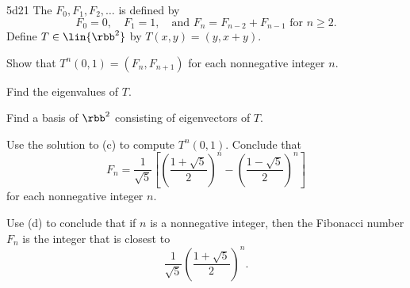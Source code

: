 \begin{exercise}{5d21}
    The  $F_0, F_1, F_2, \ldots$ is defined by
    \[
        F_0 = 0, \quad F_1 = 1, \quad \text{and } F_n = F_{n-2} + F_{n-1} \text{ for } n \geq 2.
    \]
    Define $T \in \lin{\rbb^2}$ by $T(x, y) = (y, x + y)$.
    \begin{subexercises}
        \item Show that $T^n(0, 1) = (F_n, F_{n+1})$ for each nonnegative integer $n$.
        \item Find the eigenvalues of $T$.
        \item Find a basis of $\rbb^2$ consisting of eigenvectors of $T$.
        \item Use the solution to (c) to compute $T^n(0, 1)$.
        Conclude that
        \[
            F_n = \frac{1}{\sqrt{5}}\left[\left(\frac{1 + \sqrt{5}}{2}\right)^n - \left(\frac{1 - \sqrt{5}}{2}\right)^n\right]
        \]
        for each nonnegative integer $n$.
        \item Use (d) to conclude that if $n$ is a nonnegative integer, then the Fibonacci number $F_n$ is the integer that is closest to
        \[
            \frac{1}{\sqrt{5}}\left(\frac{1 + \sqrt{5}}{2}\right)^n.
        \]
    \end{subexercises}

\end{exercise}

